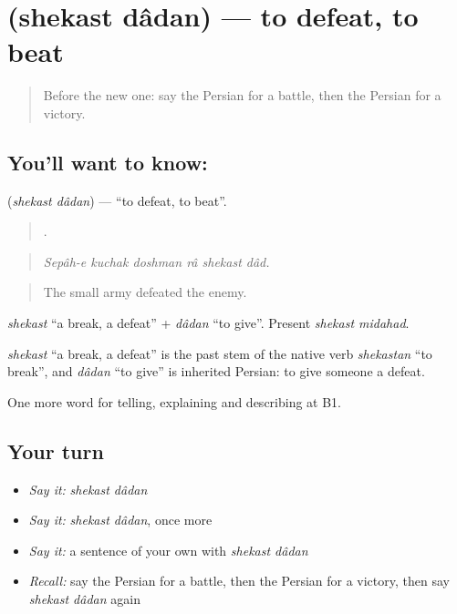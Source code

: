 \section[\texorpdfstring{\fa{شکست} \fa{دادن} (shekast dâdan)}{شکست دادن (shekast dâdan)}]{  (shekast dâdan) — to defeat, to beat}

\label{lesson:FA-C351-shekast-dadan}



\begin{quote}
Before the new one: say the Persian for a battle, then the Persian for a victory.
\end{quote}

\subsection*{You'll want to know:  }
\textbf{ } (\emph{shekast dâdan}) — \textquotedblleft{}to defeat, to beat\textquotedblright{}.

\begin{quote}
     .
\end{quote}

\begin{quote}
\emph{Sepâh-e kuchak doshman râ shekast dâd.}
\end{quote}

\begin{quote}
The small army defeated the enemy.
\end{quote}

\emph{shekast} \textquotedblleft{}a break, a defeat\textquotedblright{} + \emph{dâdan} \textquotedblleft{}to give\textquotedblright{}. Present \emph{shekast midahad}.

\begin{cousinweb}
\emph{shekast} \textquotedblleft{}a break, a defeat\textquotedblright{} is the past stem of the native verb \emph{shekastan} \textquotedblleft{}to break\textquotedblright{}, and \emph{dâdan} \textquotedblleft{}to give\textquotedblright{} is inherited Persian: to give someone a defeat.
\end{cousinweb}

\begin{grammarlens}[title={What you've built}]
One more word for telling, explaining and describing at B1.
\end{grammarlens}

\subsection*{Your turn}
\begin{itemize}
\raggedright
  \item \emph{Say it:} \emph{shekast dâdan}
  \item \emph{Say it:} \emph{shekast dâdan}, once more
  \item \emph{Say it:} a sentence of your own with \emph{shekast dâdan}
  \item \emph{Recall:} say the Persian for a battle, then the Persian for a victory, then say \emph{shekast dâdan} again
\end{itemize}

